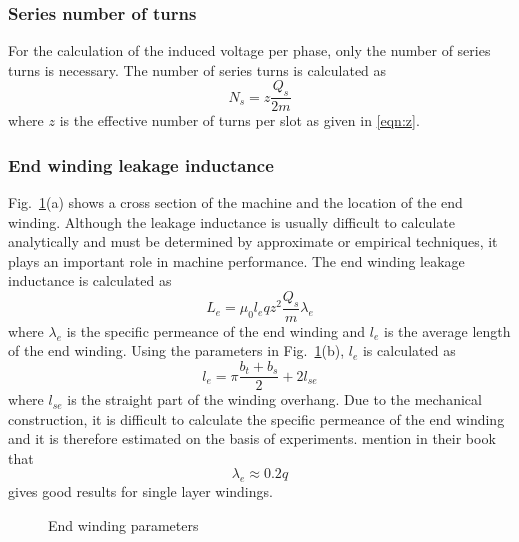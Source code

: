 \subsubsection{Series number of turns}
For the calculation of the induced voltage per phase, only the number of series turns is necessary. The number of series turns is calculated as
\begin{equation}
  \label{eqn:Ns}
  N_s = z\frac{Q_s}{2m}
\end{equation}
where $z$ is the effective number of turns per slot as given in \eqref{eqn:z}.

\subsubsection{End winding leakage inductance}\label{sec:Le}
Fig.~\ref{fig:wend_winding}(a) shows a cross section of the machine and the location of the end winding. Although the leakage inductance is usually difficult to calculate analytically and must be determined by approximate or empirical techniques, it plays an important role in machine performance. The end winding leakage inductance is calculated as
\begin{equation}
  \label{eqn:Lsigma}
  L_e = \mu_0 l_e q z^{2} \frac{Q_s}{m} \lambda_e
\end{equation}
where $\lambda_e$ is the specific permeance of the end winding and $l_e$ is the average length of the end winding. Using the parameters in Fig.~\ref{fig:wend_winding}(b), $l_e$ is calculated as
\begin{equation}
  \label{eqn:le}
  l_e = \pi\frac{b_t+b_s}{2}+2l_{se}
\end{equation} 
where $l_{se}$ is the straight part of the winding overhang. Due to the mechanical construction, it is difficult to calculate the specific permeance of the end winding and it is therefore estimated on the basis of experiments.  \cite{Gieras2002} mention in their book that 
\begin{equation}
  \lambda_e \approx 0.2q
\end{equation}  
gives good results for single layer windings. 
\begin{figure}
  \centering
    
  \caption{End winding parameters}
  \label{fig:wend_winding}
\end{figure}

